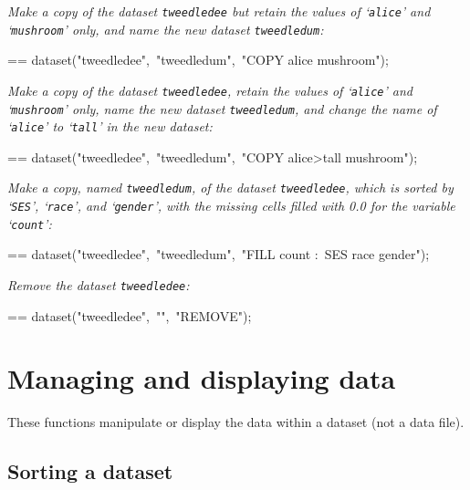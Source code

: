 \documentclass{book}
\makeatletter
\newenvironment{Texinfopreformatted}{%
  \par\GNUTobeylines\obeyspaces\frenchspacing\parskip=\z@\parindent=\z@}{}
{\catcode`\^^M=13 \gdef\GNUTobeylines{\catcode`\^^M=13 \def^^M{\null\par}}}
\newenvironment{Texinfoindented}{\begin{list}{}{}\item\relax}{\end{list}}
\renewcommand{\_}{\Texinfounderscore\discretionary{}{}{}}
\makeatother
\begin{document}
\emph{Make a copy of the dataset \texttt{tweedledee} but retain
the values of `\texttt{alice}' and `\texttt{mushroom}' only, and name the
new dataset \texttt{tweedledum}:}
\begin{Texinfoindented}
\begin{Texinfopreformatted}%
\ttfamily dataset("tweedledee",\ "tweedledum",\ "COPY alice mushroom");
\end{Texinfopreformatted}
\end{Texinfoindented}

\emph{Make a copy of the dataset \texttt{tweedledee}, retain
the values of `\texttt{alice}' and `\texttt{mushroom}' only, name the
new dataset \texttt{tweedledum}, and change the name of `\texttt{alice}'
to `\texttt{tall}' in the new dataset:}
\begin{Texinfoindented}
\begin{Texinfopreformatted}%
\ttfamily dataset("tweedledee",\ "tweedledum",\ "COPY alice>tall mushroom");
\end{Texinfopreformatted}
\end{Texinfoindented}

\emph{Make a copy, named \texttt{tweedledum}, of the dataset \texttt{tweedledee},
which is sorted by `\texttt{SES}', `\texttt{race}', and `\texttt{gender}', with the missing
cells filled with 0.0 for the variable `\texttt{count}':}
\begin{Texinfoindented}
\begin{Texinfopreformatted}%
\ttfamily dataset("tweedledee",\ "tweedledum",\ "FILL count :\ SES race gender");
\end{Texinfopreformatted}
\end{Texinfoindented}

\emph{Remove the dataset \texttt{tweedledee}:}
\begin{Texinfoindented}
\begin{Texinfopreformatted}%
\ttfamily dataset("tweedledee",\ "",\ "REMOVE");
\end{Texinfopreformatted}
\end{Texinfoindented}

\chapter{{Managing and displaying data}}
\label{anchor:Managing-and-displaying-data}%

These functions manipulate or display the data within a dataset (not a data file).


\section{{Sorting a dataset}}
\label{anchor:Sorting-a-dataset}%
\end{document}
